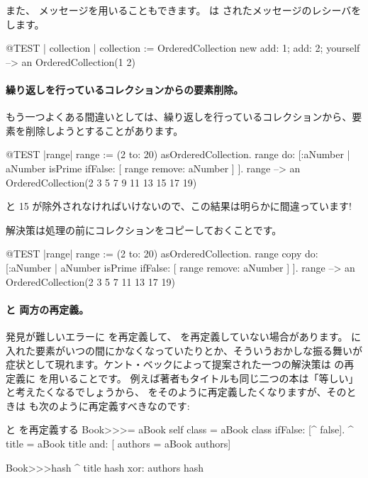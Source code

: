 \documentclass[a4paper,10pt,twoside]{book}
\begin{document}
また、 メッセージを用いることもできます。 は されたメッセージのレシーバをします。

\begin{code}{@TEST | collection |}
collection := OrderedCollection new add: 1; add: 2; yourself --> an OrderedCollection(1 2)
\end{code}

\paragraph{繰り返しを行っているコレクションからの要素削除。} もう一つよくある間違いとしては、繰り返しを行っているコレクションから、要素を削除しようとすることがあります。
\begin{code}{@TEST |range|}
range := (2 to: 20) asOrderedCollection.
range do: [:aNumber | aNumber isPrime ifFalse: [ range remove: aNumber ] ].
range --> an OrderedCollection(2 3 5 7 9 11 13 15 17 19)
\end{code}
 と 15 が除外されなければいけないので、この結果は明らかに間違っています!

解決策は処理の前にコレクションをコピーしておくことです。
\begin{code}{@TEST |range|}
range := (2 to: 20) asOrderedCollection.
range copy do: [:aNumber | aNumber isPrime ifFalse: [ range remove: aNumber ] ].
range --> an OrderedCollection(2 3 5 7 11 13 17 19)
\end{code}

\paragraph{\ct{=} と  両方の再定義。}
発見が難しいエラーに \ct{=} を再定義して、 を再定義していない場合があります。 に入れた要素がいつの間にかなくなっていたりとか、そういうおかしな振る舞いが症状として現れます。ケント・ベックによって提案された一つの解決策は  の再定義に  を用いることです。
例えば著者もタイトルも同じ二つの本は「等しい」と考えたくなるでしょうから、
\ct{=} をそのように再定義したくなりますが、そのときは  も次のように再定義すべきなのです:

\begin{method}{\lct{=} と  を再定義する}
Book>>>= aBook
   self class = aBook class ifFalse: [^ false].
   ^ title = aBook title and: [ authors = aBook authors]

Book>>>hash 
   ^ title hash xor: authors hash
\end{method}
\end{document}
